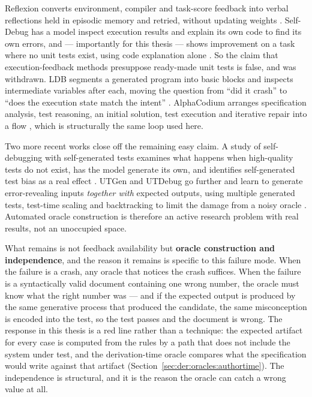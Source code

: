 Reflexion converts environment, compiler and task-score feedback into verbal reflections held
in episodic memory and retried, without updating weights \cite{shinn2023reflexion}. Self-Debug
has a model inspect execution results and explain its own code to find its own errors, and
--- importantly for this thesis --- shows improvement on a task where no unit tests exist,
using code explanation alone \cite{chen2024selfdebug}. So the claim that execution-feedback
methods presuppose ready-made unit tests is false, and was withdrawn. LDB segments a generated
program into basic blocks and inspects intermediate variables after each, moving the question
from ``did it crash'' to ``does the execution state match the intent''
\cite{zhong2024ldb}. AlphaCodium arranges specification analysis, test reasoning, an initial
solution, test execution and iterative repair into a flow \cite{ridnik2024alphacodium}, which is
structurally the same loop used here.

Two more recent works close off the remaining easy claim. A study of self-debugging with
self-generated tests examines what happens when high-quality tests do not exist, has the model
generate its own, and identifies self-generated test bias as a real effect
\cite{chen2025revisitselfdebug}. UTGen and UTDebug go further and learn to generate
error-revealing inputs \emph{together with} expected outputs, using multiple generated tests,
test-time scaling and backtracking to limit the damage from a noisy oracle
\cite{prasad2025utgen}. Automated oracle construction is therefore an active research problem
with real results, not an unoccupied space.

What remains is not feedback availability but \textbf{oracle construction and independence},
and the reason it remains is specific to this failure mode. When the failure is a crash, any
oracle that notices the crash suffices. When the failure is a syntactically valid document
containing one wrong number, the oracle must know what the right number was --- and if the
expected output is produced by the same generative process that produced the candidate, the
same misconception is encoded into the test, so the test passes and the document is wrong. The
response in this thesis is a red line rather than a technique: the expected artifact for every
case is computed from the rules by a path that does not include the system under test, and the
derivation-time oracle compares what the specification would write against that artifact
(Section~\ref{sec:der:oracles:authortime}). The independence is structural, and it is the reason
the oracle can catch a wrong value at all.

